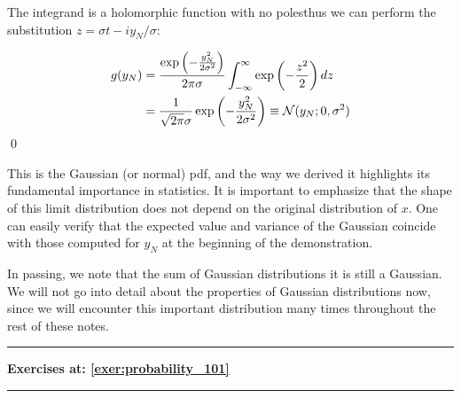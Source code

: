 \begin{example}
	The integrand is a holomorphic function with no poles\sidenotemark thus we can perform the substitution $z=\sigma t -iy_N/\sigma$:
	
	\begin{align*}
		g(y_N)&=\frac{\exp\left(-\frac{y_N^2}{2\sigma^2}\right)}{2 \pi\sigma}\int_{-\infty}^{\infty}\exp\left(-\frac{z^2}{2}\right)dz\\
		&=\frac{1}{\sqrt{2\pi}\sigma}\exp\left(-\frac{y_N^2}{2\sigma^2}\right) \equiv \mathcal{N}(y_N; 0, \sigma^2)
	\end{align*}\qed

\end{example}

This is the Gaussian (or normal) pdf, and the way we derived it highlights its fundamental importance in statistics. It is important to emphasize that the shape of this limit distribution does not depend on the original distribution of $x$.
One can easily verify that the expected value and variance of the Gaussian coincide with those computed for $y_N$ at the beginning of the demonstration.

In passing, we note that the sum of Gaussian distributions it is still a Gaussian. We will not go into detail about the properties of Gaussian distributions now, since we will encounter this important distribution many times throughout the rest of these notes.

\vspace*{1cm}
\hrule	
\begin{center}
	\textbf{Exercises at: \ref{exer:probability_101}}
\end{center}
\hrule


